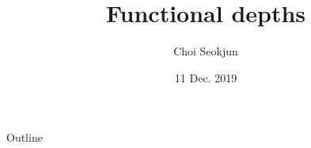 \documentclass[aspectratio=169,ignorenonframetext,9pt]{beamer}
\title{Functional depths}
\author{Choi Seokjun}
\date{11 Dec. 2019}
\theoremstyle{plain}
\theoremstyle{definition}
\begin{document}
\begin{frame}
\maketitle
\end{frame}




\begin{frame}{Outline}
\tableofcontents
\end{frame}
\end{document}
